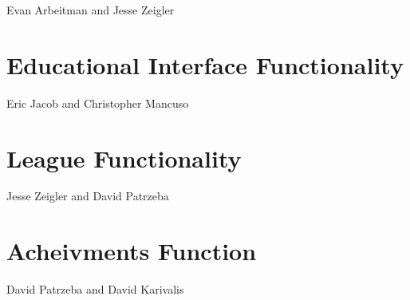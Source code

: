 \documentclass[11pt,letterpaper,oneside]{memoir}
\begin{document}
Evan Arbeitman and Jesse Zeigler

\section{Educational Interface Functionality}

Eric Jacob and Christopher Mancuso

\section{League Functionality}

Jesse Zeigler and David Patrzeba

\section{Acheivments Function}

David Patrzeba and David Karivalis
\end{document}
